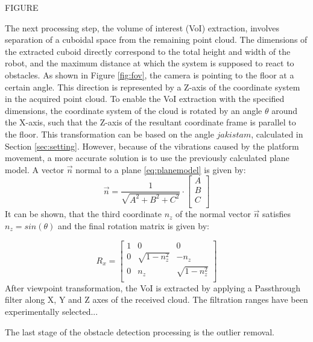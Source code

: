FIGURE

The next processing step, the volume of interest (VoI) extraction, involves separation of a cuboidal space from the remaining point cloud. The dimensions of the extracted cuboid directly correspond to the total height and width of the robot, and the maximum distance at which the system is supposed to react to obstacles. As shown in Figure \ref{fig:fov}, the camera is pointing to the floor at a certain angle. This direction is represented by a Z-axis of the coordinate system in the acquired point cloud. To enable the VoI extraction with the specified dimensions, the coordinate system of the cloud is rotated by an angle $\theta$ around the X-axis, such that the Z-axis of the resultant coordinate frame is parallel to the floor. This transformation can be based on the angle $jakistam$, calculated in Section \ref{sec:setting}. However, because of the vibrations caused by the platform movement, a more accurate solution is to use the previously calculated plane model. A vector $\vec{n}$ normal to a plane \ref{eq:planemodel} is given by:
\begin{equation}
 \vec{n} = \frac{1}{\sqrt{A^2+B^2+C^2}} \cdot \left[
\begin{array}{c}
A\\
B\\
C\\
\end{array}
\right] 
\end{equation}
It can be shown, that the third coordinate $n_z$ of the normal vector $\vec{n}$ satisfies $n_z = sin(\theta)$ and the final rotation matrix is given by:

\begin{equation}
R_x=\left[\begin{array}{ccc}
      1 & 0 & 0  \\
      0 & \sqrt{1 - n_z^2} & -n_z  \\
      0 & n_z & \sqrt{1 - n_z^2}  \\
    \end{array}\right]
\end{equation}
After viewpoint transformation, the VoI is extracted by applying a Passthrough filter along X, Y and Z axes of the received cloud. The filtration ranges have been experimentally selected...

The last stage of the obstacle detection processing is the outlier removal.  
	


